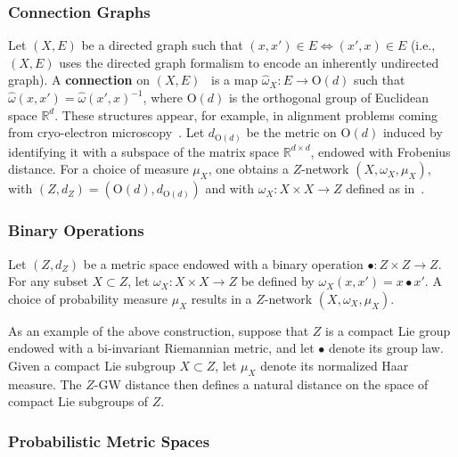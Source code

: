 \documentclass[twoside,11pt]{article}
\theoremstyle{definition}
\newcommand{\R}{\mathbb{R}}
\newcommand{\define}[1]{\textbf{#1}}
\begin{document}
 \subsubsection{Connection Graphs}

Let $(X,E)$ be a directed graph such that $(x,x') \in E \Leftrightarrow (x',x) \in E$ (i.e., $(X,E)$ uses the directed graph formalism to encode an inherently undirected graph). A \define{connection} on $(X,E)$~\citep{robertson2023generalization} is a map $\hat{\omega}_X:E \to \mathrm{O}(d)$ such that $\hat{\omega}(x,x') = \hat{\omega}(x',x)^{-1}$, where $\mathrm{O}(d)$ is the orthogonal group of Euclidean space $\R^d$. These structures appear, for example, in alignment problems coming from cryo-electron microscopy~\citep{bhamre2015orthogonal,singer2011angular}. Let $d_{\mathrm{O}(d)}$ be the metric on $\mathrm{O}(d)$ induced by identifying it with a subspace of the matrix space $\R^{d \times d}$, endowed with Frobenius distance. For a choice of measure $\mu_X$, one obtains a $Z$-network $(X,\omega_X,\mu_X)$, with $(Z,d_Z) = (\mathrm{O}(d),d_{\mathrm{O}(d)})$ and with $\omega_X:X \times X \to Z$ defined as in~.

 \subsubsection{Binary Operations} 
 
 Let $(Z,d_Z)$ be a metric space endowed with a binary operation $\bullet: Z \times Z \to Z$. For any subset $X \subset Z$, let $\omega_X:X \times X \to Z$ be defined by $\omega_X(x,x') = x \bullet x'$. A choice of probability measure $\mu_X$ results in a $Z$-network $(X,\omega_X,\mu_X)$.

 As an example of the above construction, suppose that $Z$ is a compact Lie group endowed with a bi-invariant Riemannian metric, and let $\bullet$ denote its group law. Given a compact Lie subgroup $X \subset Z$, let $\mu_X$ denote its normalized Haar measure. The $Z$-GW distance then defines a natural distance on the space of compact Lie subgroups of $Z$.

\subsubsection{Probabilistic Metric Spaces}\label{sec:probabilistic_metric_spaces}
\end{document}
